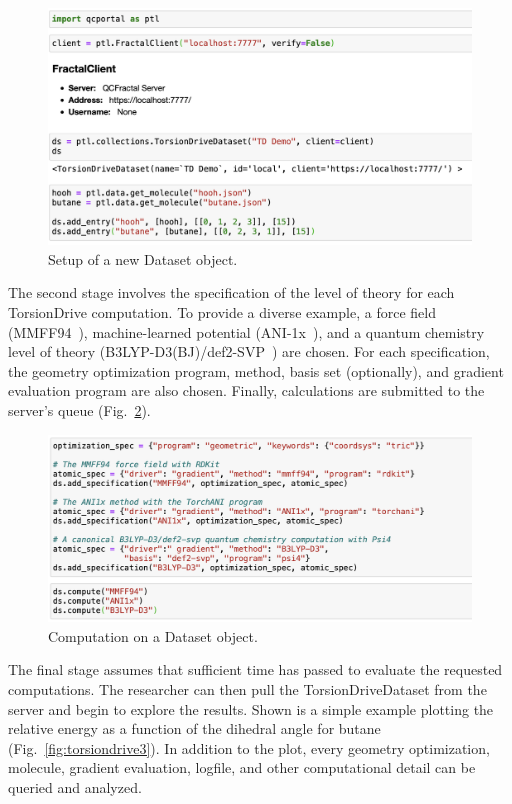 \documentclass[journal=jctcce,manuscript=article]{achemso}
\newcommand{\qcfN}{QCFractal}
\newcommand{\qcf}{{\sc{\qcfN}}\xspace}%
\begin{document}
\begin{figure}[H]
    \centering
    \includegraphics[width=\columnwidth]{./images/Example1.png}
    \caption{Setup of a new Dataset object.}
    \label{fig:torsiondrive1}
\end{figure}

The second stage involves the specification of the level of theory for each TorsionDrive computation. 
To provide a diverse example, a force field (MMFF94~\cite{halgren1996merck}), machine-learned potential (ANI-1x~\cite{smith2018less}), and a quantum chemistry level of theory (B3LYP-D3(BJ)/def2-SVP~\cite{becke1992density,grimme2011effect,weigend2005a}) are chosen.
For each specification, the geometry optimization program, method, basis set (optionally), and gradient evaluation program are also chosen. Finally, calculations are submitted to the \qcf server's queue (Fig.~\ref{fig:torsiondrive2}). 

\begin{figure}[H]
    \centering
    \includegraphics[width=\columnwidth]{./images/Example2.png}
    \caption{Computation on a Dataset object.}
    \label{fig:torsiondrive2}
\end{figure}

The final stage assumes that sufficient time has passed to evaluate the requested computations.
The researcher can then pull the TorsionDriveDataset from the server and begin to explore the results.
Shown is a simple example plotting the relative energy as a function of the dihedral angle for butane (Fig.~\ref{fig:torsiondrive3}).
In addition to the plot, every geometry optimization, molecule, gradient evaluation, logfile, and other computational detail can be queried and analyzed.
\end{document}
